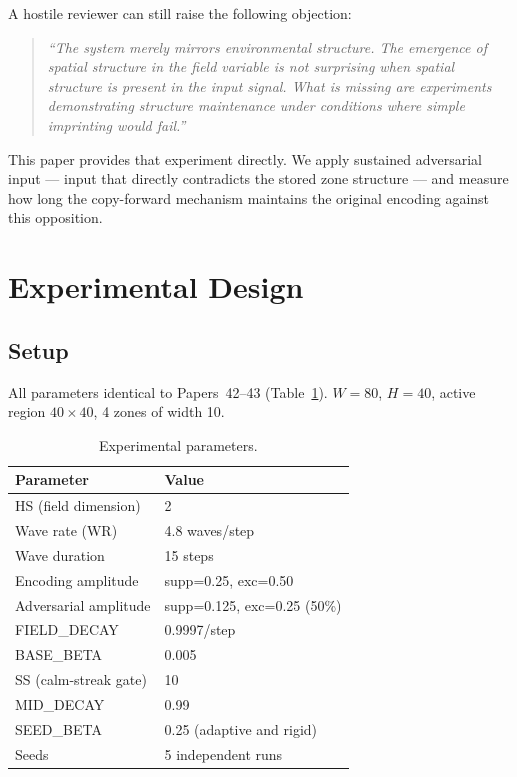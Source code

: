 \documentclass[11pt]{article}
\begin{document}
A hostile reviewer can still raise the following objection:
\begin{quote}
\textit{``The system merely mirrors environmental structure. The emergence of spatial structure
in the field variable is not surprising when spatial structure is present in the input
signal. What is missing are experiments demonstrating structure maintenance under
conditions where simple imprinting would fail.''}
\end{quote}

This paper provides that experiment directly.
We apply sustained adversarial input --- input that directly contradicts the stored
zone structure --- and measure how long the copy-forward mechanism maintains the
original encoding against this opposition.

\section{Experimental Design}

\subsection{Setup}

All parameters identical to Papers~42--43 (Table~\ref{tab:params}).
$W{=}80$, $H{=}40$, active region $40{\times}40$, 4 zones of width 10.

\begin{table}[h]
\begin{center}
\begin{tabular}{ll}
\toprule
Parameter & Value \\
\midrule
HS (field dimension) & 2 \\
Wave rate (WR)       & 4.8 waves/step \\
Wave duration        & 15 steps \\
Encoding amplitude   & supp=0.25, exc=0.50 \\
Adversarial amplitude & supp=0.125, exc=0.25 (50\%) \\
FIELD\_DECAY         & 0.9997/step \\
BASE\_BETA           & 0.005 \\
SS (calm-streak gate) & 10 \\
MID\_DECAY           & 0.99 \\
SEED\_BETA           & 0.25 (adaptive and rigid) \\
Seeds                & 5 independent runs \\
\bottomrule
\end{tabular}
\end{center}
\caption{Experimental parameters.}
\label{tab:params}
\end{table}
\end{document}
